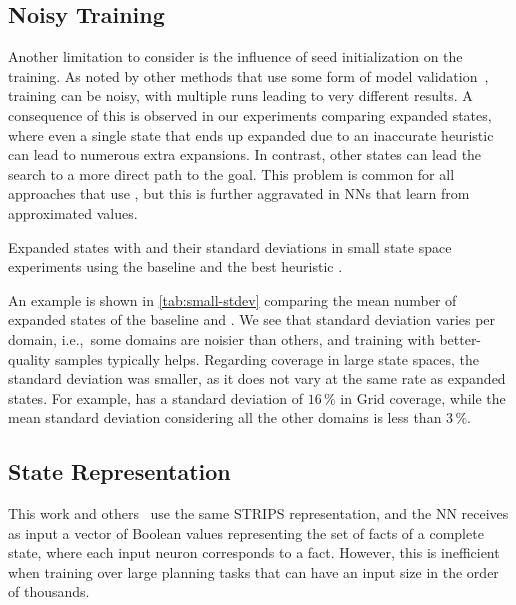 \subsection{Noisy Training}
\label{sec:noisy-training}

Another limitation to consider is the influence of seed initialization on the training. As noted by other methods that use some form of model validation~\cite{ferber2020neural, shen2020learning, ferber2022neural, otoole2022sampling}, training can be noisy, with multiple runs leading to very different results. A consequence of this is observed in our experiments comparing expanded states, where even a single state that ends up expanded due to an inaccurate heuristic can lead to numerous extra expansions. In contrast, other states can lead the search to a more direct path to the goal. This problem is common for all approaches that use \gbfs, but this is further aggravated in NNs that learn from approximated values.

\begin{table}[tb]
    \caption[Expanded states with standard deviations in small state space experiments.]{Expanded states with \gbfs and their standard deviations in small state space experiments using the baseline \hnnbase and the best heuristic \hnnrs.}
    \label{tab:small-stdev}
    \addmargin
    \centering
    
\end{table}

An example is shown in \cref{tab:small-stdev} comparing the mean number of expanded states of the baseline and \hnnrs. We see that standard deviation varies per domain, i.e.,~some domains are noisier than others, and training with better-quality samples typically helps. Regarding coverage in large state spaces, the standard deviation was smaller, as it does not vary at the same rate as expanded states. For example, \hnnrs has a standard deviation of $16\,\%$ in Grid coverage, while the mean standard deviation considering all the other domains is less than $3\,\%$.

\subsection{State Representation}
\label{sec:limitation-representation}

This work and others~\cite{ferber2020neural, ferber2022neural, otoole2022sampling} use the same STRIPS representation, and the NN receives as input a vector of Boolean values representing the set of facts of a complete state, where each input neuron corresponds to a fact. However, this is inefficient when training over large planning tasks that can have an input size in the order of thousands.

